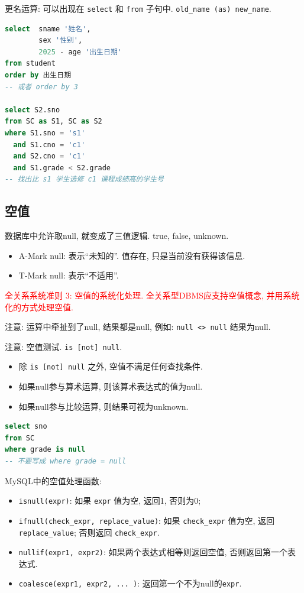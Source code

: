 更名运算: 可以出现在 \verb|select| 和 \verb|from| 子句中. \verb|old_name (as) new_name|.

\begin{lstlisting}[language=SQL]
select  sname '姓名',
        sex '性别',
        2025 - age '出生日期'
from student
order by 出生日期
-- 或者 order by 3

select S2.sno
from SC as S1, SC as S2
where S1.sno = 's1'
  and S1.cno = 'c1'
  and S2.cno = 'c1'
  and S1.grade < S2.grade
-- 找出比 s1 学生选修 c1 课程成绩高的学生号
\end{lstlisting}

\subsection{空值}

数据库中允许取null, 就变成了三值逻辑. true, false, unknown.
\begin{itemize}
  \item A-Mark null: 表示“未知的”. 值存在, 只是当前没有获得该信息.
  \item T-Mark null: 表示“不适用”.
\end{itemize}

\textcolor{red}{全关系系统准则 3: 空值的系统化处理. 全关系型DBMS应支持空值概念, 并用系统化的方式处理空值.}

注意: 运算中牵扯到了null, 结果都是null, 例如: \verb|null <> null| 结果为null.

注意: 空值测试. \verb|is [not] null|.
\begin{itemize}
  \item 除 \verb|is [not] null| 之外, 空值不满足任何查找条件.
  \item 如果null参与算术运算, 则该算术表达式的值为null.
  \item 如果null参与比较运算, 则结果可视为unknown.
\end{itemize}

\begin{lstlisting}[language=SQL]
select sno
from SC
where grade is null
-- 不要写成 where grade = null
\end{lstlisting}

MySQL中的空值处理函数:
\begin{itemize}
  \item \verb|isnull(expr)|: 如果 \verb|expr| 值为空, 返回1, 否则为0;
  \item \verb|ifnull(check_expr, replace_value)|: 如果 \verb|check_expr| 值为空, 返回\verb|replace_value|; 否则返回 \verb|check_expr|.
  \item \verb|nullif(expr1, expr2)|: 如果两个表达式相等则返回空值, 否则返回第一个表达式.
  \item \verb|coalesce(expr1, expr2, ... )|: 返回第一个不为null的\verb|expr|.
\end{itemize}

